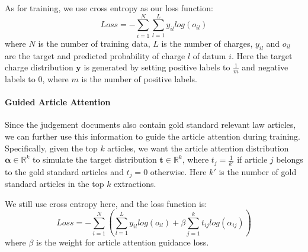 As for training, we use cross entropy as our loss function:
\begin{equation}
\label{original_loss}
Loss= -\sum_{i=1}^N\sum_{l=1}^L{y_{il} log(o_{il})}
\end{equation} 
where $N$ is the number of training data, $L$ is the number of charges, $y_{il}$ and $o_{il}$ are the target and predicted probability of charge $l$ of datum $i$. Here the target charge distribution $\mathbf{y}$ is generated by setting positive labels to $\frac{1}{m}$ and negative labels to $0$, where $m$ is the number of positive labels.

\paragraph{Guided Article Attention}
Since the judgement documents also contain gold standard relevant law articles, we can further use this information to guide the article attention during training. Specifically, given the top $k$ articles, we want the article attention distribution $\bm{\alpha}\in\mathbb{R}^k$ to simulate the target distribution $\mathbf{t}\in\mathbb{R}^k$, where $t_j=\frac{1}{k'}$ if article $j$ belongs to the gold standard articles and $t_j=0$ otherwise. Here $k'$ is the number of gold standard articles in the top $k$ extractions.


We still use cross entropy here, and the loss function is:
\begin{equation}
\label{final_loss}
Loss = -\sum_{i=1}^N(\sum_{l=1}^L{y_{il} log(o_{il})} + \beta \sum_{j=1}^k{t_{ij} log(\alpha_{ij})})
\end{equation}
where $\beta$ is the weight for article attention guidance loss.



